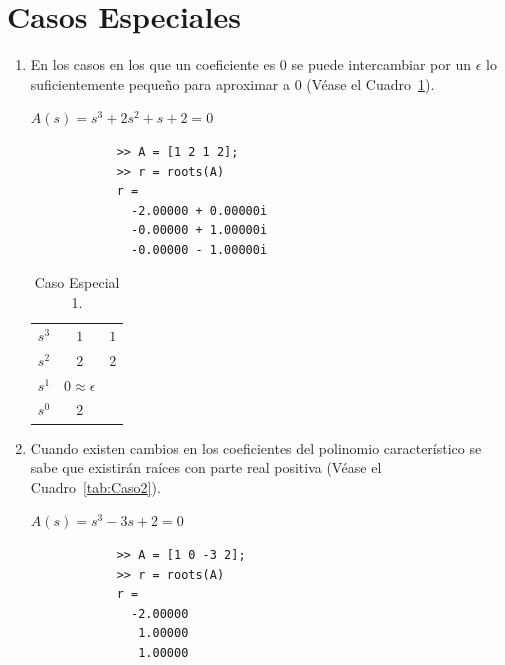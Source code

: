     \section{Casos Especiales}
        \begin{enumerate}

            \item En los casos en los que un coeficiente es $0$ se puede intercambiar por un $\epsilon$ lo suficientemente pequeño para aproximar a $0$ (Véase el Cuadro~\ref{tab:Caso1}).

            \begin{math}
            A(s) = s^3 + 2 s^2 + s + 2 = 0
            \end{math}

            \begin{verbatim}
            >> A = [1 2 1 2];
            >> r = roots(A)
            r =
              -2.00000 + 0.00000i
              -0.00000 + 1.00000i
              -0.00000 - 1.00000i
            \end{verbatim}

            \begin{table}[htbp]
                \centering
                \begin{tabular}{c|c c}
                $s^3$ & $1$ & $1$ \\
                $s^2$ & $2$ & $2$ \\
                $s^1$ & $0 \approx \epsilon$ \\
                $s^0$ & $2$
                \end{tabular}
            \caption{\label{tab:Caso1}Caso Especial 1.}
            \end{table}

            \item Cuando existen cambios en los coeficientes del polinomio característico se sabe que existirán raíces con parte real positiva (Véase el Cuadro~\ref{tab:Caso2}).

            \begin{math}
                A(s) = s^3 - 3 s + 2 = 0
            \end{math}

            \begin{verbatim}
            >> A = [1 0 -3 2];
            >> r = roots(A)
            r =
              -2.00000
               1.00000
               1.00000
            \end{verbatim}


\end{enumerate}
